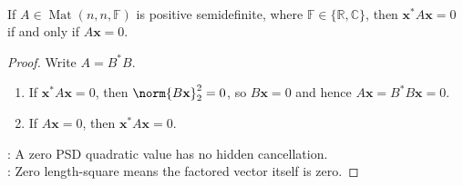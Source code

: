 \begin{corollary} \label{cor:positive-semidefinite-zero-quadratic-form} \\
If $A\in\operatorname{Mat}(n,n,\mathbb{F})$ is positive semidefinite, where $\mathbb{F}\in\{\mathbb{R},\mathbb{C}\}$, then $\mathbf{x}^*A\mathbf{x}=0$ if and only if $A\mathbf{x}=0$.
\begin{proof}
Write $A=B^*B$.
\begin{enumerate}[label=\roman*.]
\setlength{\itemsep}{0pt}
\item[$(\Rightarrow)$] If $\mathbf{x}^*A\mathbf{x}=0$, then $\norm{B\mathbf{x}}_2^2=0$, so $B\mathbf{x}=0$ and hence $A\mathbf{x}=B^*B\mathbf{x}=0$.
\item[$(\Leftarrow)$] If $A\mathbf{x}=0$, then $\mathbf{x}^*A\mathbf{x}=0$.
\end{enumerate}
: A zero PSD quadratic value has no hidden cancellation.\\
: Zero length-square means the factored vector itself is zero.
\end{proof}
\end{corollary}

